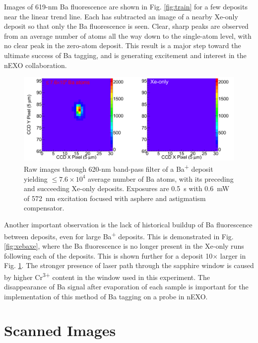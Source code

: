 Images of 619-nm Ba fluorescence are shown in Fig. \ref{fig:train} for a few deposits near the linear trend line.  Each has subtracted an image of a nearby Xe-only deposit so that only the Ba fluorescence is seen.  Clear, sharp peaks are observed from an average number of atoms all the way down to the single-atom level, with no clear peak in the zero-atom deposit.  This result is a major step toward the ultimate success of Ba tagging, and is generating excitement and interest in the nEXO collaboration.

\begin{figure} %
        \centering
                \includegraphics[width=.95\textwidth]{figures/xebaxe_largest_average.png}
                \caption{Raw images through 620-nm band-pass filter of a Ba\textsuperscript{+} deposit yielding $\leq 7.6 \times 10^{4}$ average number of Ba atoms, with its preceding and succeeding Xe-only deposits.  Exposures are 0.5~s with 0.6~mW of 572~nm excitation focused with asphere and astigmatism compensator.}
\label{fig:xebaxeLarger}
\end{figure}

Another important observation is the lack of historical buildup of Ba fluorescence between deposits, even for large Ba\textsuperscript{+} deposits.  This is demonstrated in Fig. \ref{fig:xebaxe}, where the Ba fluorescence is no longer present in the Xe-only runs following each of the deposits.  This is shown further for a deposit 10$\times$ larger in Fig. \ref{fig:xebaxeLarger}.  The stronger presence of laser path through the sapphire window is caused by higher Cr\textsuperscript{3+} content in the window used in this experiment.  The disappearance of Ba signal after evaporation of each sample is important for the implementation of this method of Ba tagging on a probe in nEXO.

\section{Scanned Images}
\label{sec:scanning}

